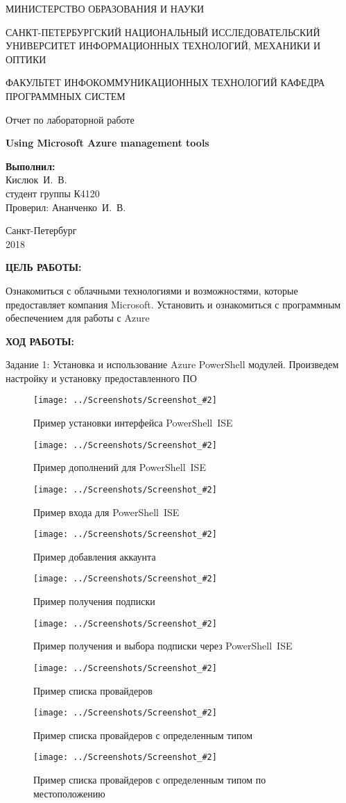 \documentclass[14pt,a4paper]{extreport}
\newcommand{\screenshot}[2]{\begin{figure}[ht]%
\centering\texttt{[image: ../Screenshots/Screenshot\_\#2]}%
\caption{#1}%
\label{picture#2}%
\end{figure}%
}
\newcommand{\header}[1]{%
{
\fontsize{16pt}{14pt}\selectfont
\begin{center}
\textbf{\MakeUppercase{#1}:}
\end{center}
}
}
\newcommand{\prepod}{Ананченко~И.~В.}
\newcommand{\igork}{Кислюк~И.~В.}
\newcommand{\pse}{PowerShell~ISE}
\begin{document}
	\begin{titlepage}
	\begin{center}	
		\fontsize{14pt}{14pt}\selectfont
		МИНИСТЕРСТВО ОБРАЗОВАНИЯ И НАУКИ\\

		\vspace*{0.6\baselineskip}
		
		САНКТ-ПЕТЕРБУРГСКИЙ НАЦИОНАЛЬНЫЙ ИССЛЕДОВАТЕЛЬСКИЙ УНИВЕРСИТЕТ ИНФОРМАЦИОННЫХ ТЕХНОЛОГИЙ, МЕХАНИКИ И ОПТИКИ
		
		\vspace*{0.6\baselineskip}
		ФАКУЛЬТЕТ ИНФОКОММУНИКАЦИОННЫХ ТЕХНОЛОГИЙ
		КАФЕДРА ПРОГРАММНЫХ СИСТЕМ
	
		\vspace*{7\baselineskip}
		\fontsize{19pt}{18pt}\selectfont
		Отчет по лабораторной работе
		
		\fontsize{20pt}{18pt}\selectfont
		\textbf{Using Microsoft Azure management tools}\\
		\vspace*{1.15\baselineskip}
		\end{center}
	
	\vspace*{2\baselineskip}
	\begin{flushright}
	\fontsize{14pt}{14pt}\selectfont
	\textbf{Выполнил:}\\
	\igork\\
	студент группы К4120\\
	Проверил: \prepod\\
	\end{flushright}
	
	\vspace{\fill}
	\begin{center}
	Санкт-Петербург\\
	2018
	\end{center}
	
\end{titlepage}

\newpage

\header{Цель работы}

\fontsize{14pt}{14pt}\selectfont

Ознакомиться с облачными технологиями и возможностями, которые предоставляет компания Microsoft. Установить и ознакомиться с программным обеспечением для работы с Azure
\clearpage

\header{Ход работы}

Задание 1: Установка и использование Azure PowerShell модулей. Произведем настройку и установку предоставленного ПО
\screenshot{Пример установки интерфейса \pse}{1}
\screenshot{Пример дополнений для \pse}{2}
\screenshot{Пример входа для \pse}{3}
\screenshot{Пример добавления аккаунта}{4}
\screenshot{Пример получения подписки}{5}
\screenshot{Пример получения и выбора подписки через \pse}{6}
\screenshot{Пример списка провайдеров}{7}
\screenshot{Пример списка провайдеров с определенным типом}{8}
\screenshot{Пример списка провайдеров с определенным типом по местоположению}{9}
\end{document}
